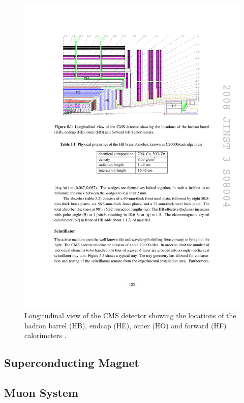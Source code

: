 \begin{figure}[htbp]
  \begin{center}
    \leavevmode
    \includegraphics[width=\columnwidth]{HCAL}
    \caption{Longitudinal view of the CMS detector showing the locations of the hadron barrel (HB), endcap (HE), outer
    (HO) and forward (HF) calorimeters
    \cite{CMS}.}
    \label{HCAL}
  \end{center}
\end{figure}

\subsection{Superconducting Magnet}

\subsection{Muon System}

